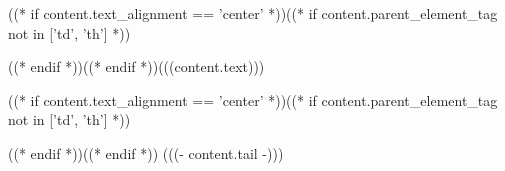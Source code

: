 \noindent ((* if content.text_alignment == 'center' *))((* if content.parent_element_tag not in ['td', 'th'] *)){((* endif *))\centering\arraybackslash ((* endif *))(((content.text)))\par((* if content.text_alignment == 'center' *))((* if content.parent_element_tag not in ['td', 'th'] *))}((* endif *))((* endif *)) (((- content.tail -)))